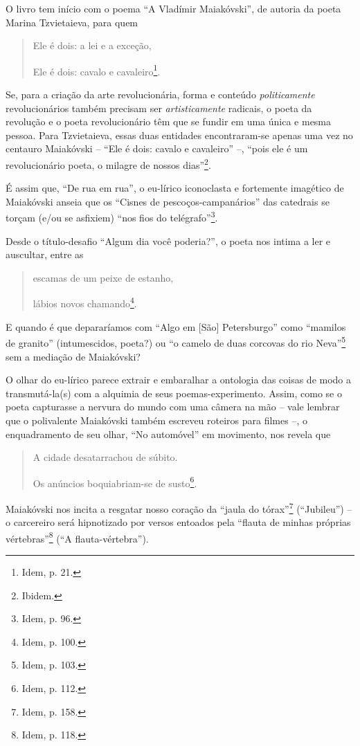 O livro tem início com o poema ``A Vladímir Maiakóvski'', de autoria da
poeta Marina Tzvietaieva, para quem

\begin{quote}
Ele é dois: a lei e a exceção,

Ele é dois: cavalo e cavaleiro\footnote{Idem, p. 21.}.
\end{quote}

Se, para a criação da arte revolucionária, forma e conteúdo
\emph{politicamente} revolucionários também precisam ser
\emph{artisticamente} radicais, o poeta da revolução e o poeta
revolucionário têm que se fundir em uma única e mesma pessoa. Para
Tzvietaieva, essas duas entidades encontraram-se apenas uma vez no
centauro Maiakóvski -- ``Ele é dois: cavalo e cavaleiro'' --, ``pois ele
é um revolucionário poeta, o milagre de nossos dias''\footnote{Ibidem.}.

É assim que, ``De rua em rua'', o eu-lírico iconoclasta e fortemente
imagético de Maiakóvski anseia que os ``Cisnes de pescoços-campanários''
das catedrais se torçam (e/ou se asfixiem) ``nos fios do
telégrafo''\footnote{Idem, p. 96.}.

Desde o título-desafio ``Algum dia você poderia?'', o poeta nos intima a
ler e auscultar, entre as

\begin{quote}
escamas de um peixe de estanho,

lábios novos chamando\footnote{Idem, p. 100.}.
\end{quote}

E quando é que depararíamos com ``Algo em {[}São{]} Petersburgo'' como
``mamilos de granito'' (intumescidos, poeta?) ou ``o camelo de duas
corcovas do rio Neva''\footnote{Idem, p. 103.} sem a mediação de
Maiakóvski?

O olhar do eu-lírico parece extrair e embaralhar a ontologia das coisas
de modo a transmutá-la(s) com a alquimia de seus poemas-experimento.
Assim, como se o poeta capturasse a nervura do mundo com uma câmera na
mão -- vale lembrar que o polivalente Maiakóvski também escreveu
roteiros para filmes --, o enquadramento de seu olhar, ``No automóvel''
em movimento, nos revela que

\begin{quote}
A cidade desatarrachou de súbito.

Os anúncios boquiabriam-se de susto\footnote{Idem, p. 112.}.
\end{quote}

Maiakóvski nos incita a resgatar nosso coração da ``jaula do
tórax''\footnote{Idem, p. 158.} (``Jubileu'') -- o carcereiro será
hipnotizado por versos entoados pela ``flauta de minhas próprias
vértebras''\footnote{Idem, p. 118.} (``A flauta-vértebra'').

